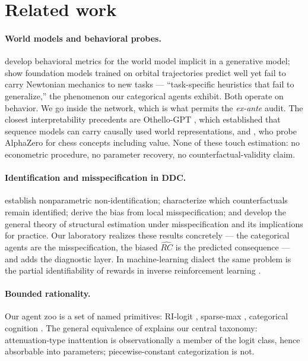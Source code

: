 \documentclass[11pt]{article}
\newcommand{\rhat}{\widehat{RC}}
\begin{document}
\section{Related work}\label{sec:lit}

\paragraph{World models and behavioral probes.} \citet{vafa2024} develop
behavioral metrics for the world model implicit in a generative model;
\citet{vafa2025} show foundation models trained on orbital trajectories
predict well yet fail to carry Newtonian mechanics to new tasks ---
``task-specific heuristics that fail to generalize,'' the phenomenon our
categorical agents exhibit. Both operate on behavior. We go inside the
network, which is what permits the \emph{ex-ante} audit. The closest
interpretability precedents are Othello-GPT \citep{li2023, nanda2023},
which established that sequence models can carry causally used world
representations, and \citet{mcgrath2022}, who probe AlphaZero for chess
concepts including value. None of these touch estimation: no econometric
procedure, no parameter recovery, no counterfactual-validity claim.

\paragraph{Identification and misspecification in DDC.}
\citet{magnacthesmar2002} establish nonparametric non-identification;
\citet{kalouptsidi2021} characterize which counterfactuals remain identified;
\citet{bugniura2019} derive the bias from local misspecification; and
\citet{andrews2025} develop the general theory of structural estimation
under misspecification and its implications for practice. Our laboratory
realizes these results concretely --- the categorical agents are the
misspecification, the biased $\rhat$ is the predicted consequence --- and
adds the diagnostic layer. In machine-learning dialect the same problem
is the partial identifiability of rewards in inverse reinforcement learning
\citep{skalseabate2024}.

\paragraph{Bounded rationality.} Our agent zoo is a set of named
primitives: RI-logit \citep{matejkamckay2015, steiner2017}, sparse-max
\citep{gabaix2014}, categorical cognition \citep{fryerjackson2008}. The
general equivalence of \citet{fosgerau2020} explains our central taxonomy:
attenuation-type inattention is observationally a member of the logit class,
hence absorbable into parameters; piecewise-constant categorization is not.
\end{document}
